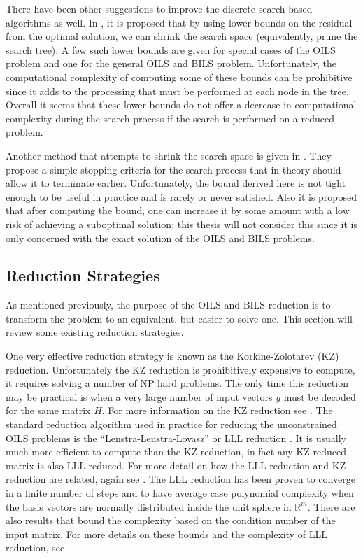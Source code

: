 \documentclass[12pt,Bold,letterpaper]{mcgilletdclass}
\newcommand{\vsp}{\vspace{\baselineskip}}
\begin{document}
There have been other suggestions to improve the discrete search based algorithms as well. In \cite{StoVH08}, it is proposed that by using lower bounds on the residual from the optimal solution, we can shrink the search space (equivalently, prune the search tree). A few such lower bounds are given for special cases of the OILS problem and one for the general OILS and BILS problem. Unfortunately, the computational complexity of computing some of these bounds can be prohibitive since it adds to the processing that must be performed at each node in the tree. Overall it seems that these lower bounds do not offer a decrease in computational complexity during the search process if the search is performed on a reduced problem.

Another method that attempts to shrink the search space is given in \cite{SchFL09}. They propose a simple stopping criteria for the search process that in theory should allow it to terminate earlier. Unfortunately, the bound derived here is not tight enough to be useful in practice and is rarely or never satisfied. Also it is proposed that after computing the bound, one can increase it by some amount with a low risk of achieving a suboptimal solution; this thesis will not consider this since it is only concerned with the exact solution of the OILS and BILS problems. 

\vsp \subsection{Reduction Strategies} \label{subsec:Reductions}

As mentioned previously, the purpose of the OILS and BILS reduction is to transform the problem to an equivalent, but easier to solve one. This section will review some existing reduction strategies.

One very effective reduction strategy is known as the Korkine-Zolotarev (KZ)
reduction. Unfortunately the KZ reduction is prohibitively expensive to compute,
it requires solving a number of NP hard problems. The only time this reduction
may be practical is when a very large number of input vectors $y$ must be
decoded for the same matrix $H$. For more information on the KZ reduction see
\cite{AgrEVZ02}. The standard reduction algorithm used in practice for reducing
the unconstrained OILS problems is the ``Lenstra-Lenstra-Lovasz'' or LLL
reduction \cite{LenLL82}. It is usually much more efficient to compute than the
KZ reduction, in fact any KZ reduced matrix is also LLL reduced. For more detail
on how the LLL reduction and KZ reduction are related, again see
\cite{AgrEVZ02}. The LLL reduction has been proven to converge in a finite
number of steps and to have average case polynomial complexity when the basis
vectors are normally distributed inside the unit sphere in $\mathbb{R}^m$. There
are also results that bound the complexity based on the condition number of the
input matrix. For more details on these bounds and the complexity of LLL
reduction, see \cite{WubSJM11}.
\end{document}
